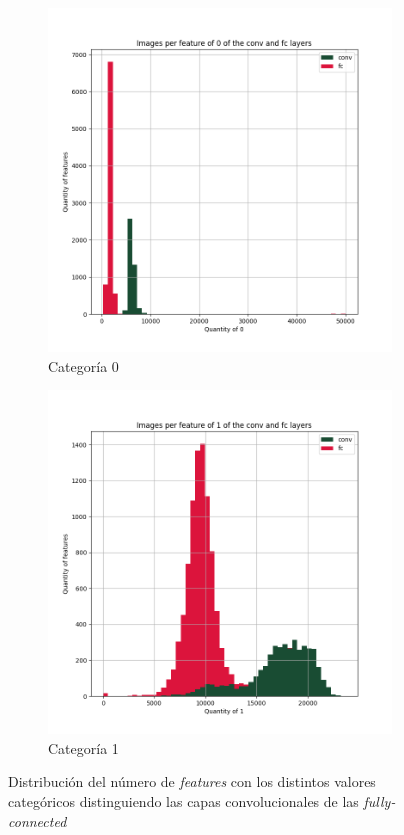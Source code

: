 \documentclass[12,twoside]{TFG-GM}
\theoremstyle{definition}
\theoremstyle{remark}
\begin{document}
\begin{figure}[ht]
\begin{subfigure}[b]{0.3\textwidth}
		\includegraphics[width=\textwidth]  {Images/plots/25/Images_per_feature_of_0_category_all_layers.png}
		\caption{Categoría 0}
	\end{subfigure}
	\begin{subfigure}[b]{0.3\textwidth}
		\includegraphics[width=\textwidth]  {Images/plots/25/Images_per_feature_of_1_category_all_layers.png}
		\caption{Categoría 1}
	\end{subfigure}       
	\caption{Distribución del número de \textit{features} con los distintos valores categóricos distinguiendo las capas convolucionales de las \textit{fully-connected}  \label{fig:imagesperfeature}}
\end{figure}
\end{document}
